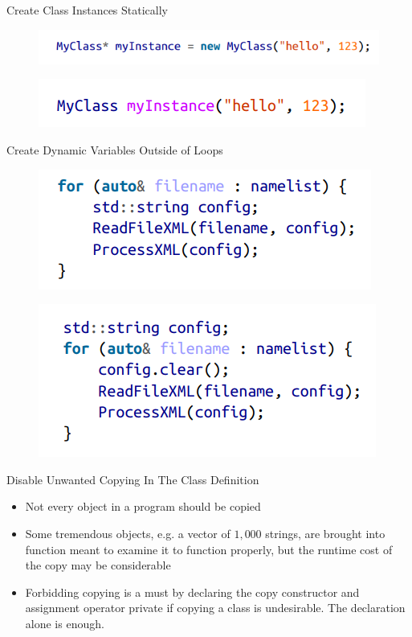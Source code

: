 \documentclass[aspectratio=169,xcolor=dvipsnames]{beamer}
\begin{document}
\begin{frame}{Create Class Instances Statically}
    \begin{figure}
        \centering
        \includegraphics[scale = 0.9]{class_instance_1.png}
        \label{fig:my_label}
    \end{figure}
    \begin{figure}
        \centering
        \includegraphics[scale = 0.9]{class_instance_2.png}
        \label{fig:my_label}
    \end{figure}
\end{frame}
\begin{frame}{Create Dynamic Variables Outside of Loops}
    \begin{figure}
        \centering
        \includegraphics[scale = 0.9]{outside-1.png}
        \label{fig:my_label}
    \end{figure}
    \begin{figure}
        \centering
        \includegraphics[scale = 0.9]{outside-2.png}
        \label{fig:my_label}
    \end{figure}
\end{frame}
\begin{frame}{Disable Unwanted Copying In The Class Definition}
    \begin{itemize}
        \item Not every object in a program should be copied 
        \item Some tremendous objects, e.g. a vector of $1,000$ strings, are brought into function meant to examine it to function properly, but the runtime cost of the copy may be considerable
        \item Forbidding copying is a must by declaring the copy constructor and assignment
operator private if copying a class is undesirable. The declaration alone is enough.

    \end{itemize}
\end{frame}
\end{document}
